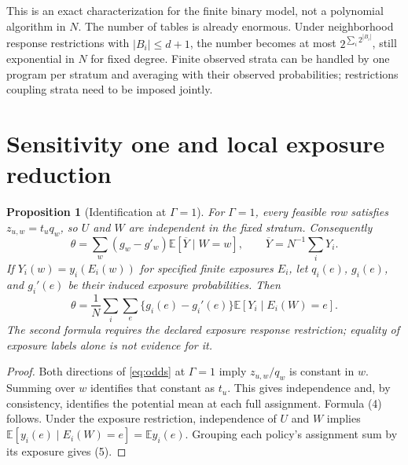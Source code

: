 \documentclass[11pt,a4paper]{article}
\newtheorem{proposition}[theorem]{Proposition}
\theoremstyle{definition}
\theoremstyle{remark}
\newcommand{\E}{\mathbb E}
\begin{document}
This is an exact characterization for the finite binary model, not a polynomial algorithm in $N$. The number of tables is already enormous. Under neighborhood response restrictions with $|B_i|\le d+1$, the number becomes at most $2^{\sum_i2^{|B_i|}}$, still exponential in $N$ for fixed degree. Finite observed strata can be handled by one program per stratum and averaging with their observed probabilities; restrictions coupling strata need to be imposed jointly.

\section{Sensitivity one and local exposure reduction}
\begin{proposition}[Identification at $\Gamma=1$]
For $\Gamma=1$, every feasible row satisfies $z_{u,w}=t_uq_w$, so $U$ and $W$ are independent in the fixed stratum. Consequently
\[
 \theta=\sum_w(g_w-g'_w)\E[\overline Y\mid W=w],
 \qquad \overline Y=N^{-1}\sum_iY_i.
 \tag{4}
\]
If $Y_i(w)=y_i(E_i(w))$ for specified finite exposures $E_i$, let $q_i(e)$, $g_i(e)$, and $g_i'(e)$ be their induced exposure probabilities. Then
\[
 \theta=\frac1N\sum_i\sum_e
       \{g_i(e)-g_i'(e)\}\E[Y_i\mid E_i(W)=e]. \tag{5}
\]
The second formula requires the declared exposure response restriction; equality of exposure labels alone is not evidence for it.
\end{proposition}
\begin{proof}
Both directions of \eqref{eq:odds} at $\Gamma=1$ imply $z_{u,w}/q_w$ is constant in $w$. Summing over $w$ identifies that constant as $t_u$. This gives independence and, by consistency, identifies the potential mean at each full assignment. Formula (4) follows. Under the exposure restriction, independence of $U$ and $W$ implies $\E[y_i(e)\mid E_i(W)=e]=\E y_i(e)$. Grouping each policy's assignment sum by its exposure gives (5).
\end{proof}
\end{document}
